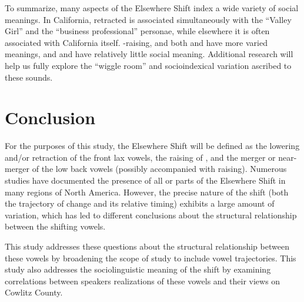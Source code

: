 
To summarize, many aspects of the Elsewhere Shift index a wide variety of social meanings. In California, retracted \bat is associated simultaneously with the ``Valley Girl'' and the ``business professional'' personae, while elsewhere it is often associated with California itself. \ban-raising, and both \lot and \thought have more varied meanings, and \bet and \bit have relatively little social meaning. Additional research will help us fully explore the ``wiggle room'' and socioindexical variation ascribed to these sounds.

\section{Conclusion}

For the purposes of this study, the Elsewhere Shift will be defined as the lowering and/or retraction of the front lax vowels, the raising of \ban, and the merger or near-merger of the low back vowels (possibly accompanied with raising). Numerous studies have documented the presence of all or parts of the Elsewhere Shift in many regions of North America. However, the precise nature of the shift (both the trajectory of change and its relative timing) exhibits a large amount of variation, which has led to different conclusions about the structural relationship between the shifting vowels.

This study addresses these questions about the structural relationship between these vowels by broadening the scope of study to include vowel trajectories. This study also addresses the sociolinguistic meaning of the shift by examining correlations between speakers realizations of these vowels and their views on Cowlitz County.


